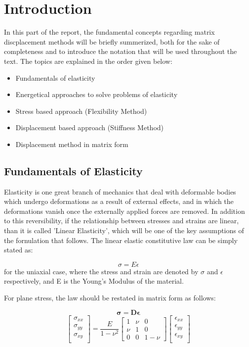 \section{Introduction}
In this part of the report, the fundamental concepts regarding matrix discplacement
methods will be briefly summerized, both for the sake of completeness and to 
introduce the notation that will be used throughout the text. The topics are 
explained in the order given below:
\begin{itemize}
   \item Fundamentals of elasticity
   \item Energetical approaches to solve problems of elasticity
   \item Stress based approach (Flexibility Method)
   \item Displacement based approach (Stiffness Method)
   \item Displacement method in matrix form
\end{itemize}   
%
%
\subsection{Fundamentals of Elasticity}
Elasticity is one great branch of mechanics that deal with deformable bodies which
undergo deformations as a result of external effects, and in which the deformations
vanish once the externally applied forces are removed. In addition to this
reversibility, if the relationship between stresses and strains are linear, than it 
is called 'Linear Elasticity', which will be one of the key assumptions of the 
fornulation that follows. The linear elastic constitutive law can be simply stated as:

\begin{equation}
	\sigma = E \epsilon
\end{equation}
for the uniaxial case, where the stress and strain are denoted by $\sigma$ and 
$\epsilon$  respectively, and E is the Young's Modulus of the material. 

For plane stress, the law should be restated in matrix form as follows:

\begin{equation*}
	\bm{\sigma = D \epsilon}
\end{equation*}
\begin{equation*}
	\begin{bmatrix}
		\sigma_{xx} \\
		\sigma_{yy} \\
		\sigma_{xy} \\
	\end{bmatrix}
	= \frac{E}{1-\nu^2}
	\begin{bmatrix}
		1 & \nu & 0 \\
		\nu & 1 & 0 \\
		0 & 0 & 1-\nu
	\end{bmatrix}
	\begin{bmatrix}
		\epsilon_{xx} \\
		\epsilon_{yy} \\
		\epsilon_{xy} \\
	\end{bmatrix}
\end{equation*}

